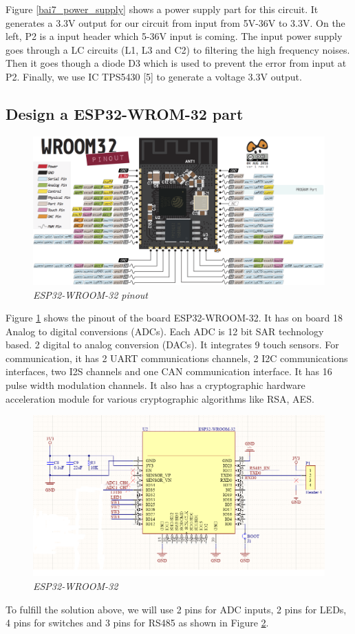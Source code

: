 Figure \ref{bai7_power_supply} shows a power supply part for this circuit. It generates a 3.3V output for our circuit from input from 5V-36V to 3.3V. On the left, P2 is a input header which 5-36V input is coming. The input power supply goes through a LC circuits (L1, L3 and C2) to filtering the high frequency noises. Then it goes though a diode D3 which is used to prevent the error from input at P2. Finally, we use IC TPS5430 [5] to generate a voltage 3.3V output. 
\newpage
\subsection{Design a ESP32-WROM-32 part}
\begin{figure}[!htp]
    \centering
    \includegraphics[width=5in]{source/picture/bai_7/bai7_esp32_pinout.png}
    \caption{\textit{ESP32-WROOM-32 pinout}}
    \label{bai7_esp32_pinout}
\end{figure}

Figure \ref{bai7_esp32_pinout} shows the pinout of the board ESP32-WROOM-32. 
It has on board 18 Analog to digital conversions (ADCs).  Each ADC is 12 bit SAR technology based.
2 digital to analog conversion (DACs). It integrates 9 touch sensors.
For communication, it has 2 UART communications channels, 2 I2C communications interfaces, two I2S channels and one CAN communication interface.
It has 16 pulse width modulation channels.
It also has a cryptographic hardware acceleration module for various cryptographic algorithms like RSA, AES.


\begin{figure}[!htp]
    \centering
    \includegraphics[width=5in]{source/picture/bai_7/bai7_mcu.png}
    \caption{\textit{ESP32-WROOM-32}}
    \label{bai7_mcu}
\end{figure}
To fulfill the solution above, we will use 2 pins for ADC inputs, 2 pins for LEDs, 4 pins for switches and 3 pins for RS485 as shown in Figure \ref{bai7_mcu}.
\newpage

